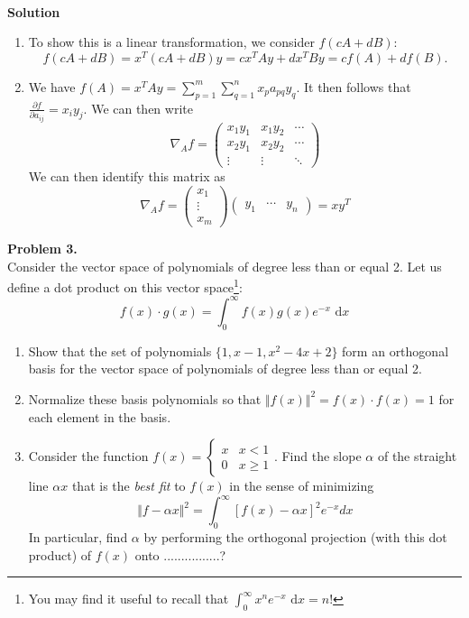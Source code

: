 \documentclass[11pt]{article}
\newcommand{\diff}{\,\mathrm{d}}
\begin{document}
\

\noindent \textbf{Solution}\\
\begin{enumerate}
\item To show this is a linear transformation, we consider $f(cA+dB)$:
$$f(cA+dB) = x^T(cA +dB) y = c x^TAy + dx^TBy = cf(A) + df(B).$$
\item We have $f(A) = x^TAy = \sum_{p = 1}^m\sum_{q = 1}^n x_p a_{pq} y_q$. It then follows that $\frac{\partial f}{\partial a_{ij}} = x_iy_j$. We can then write 
$$
\nabla_A f = \begin{pmatrix} x_1y_1 & x_1y_2 & \cdots \\ x_2y_1 & x_2y_2 & \cdots \\ \vdots & \vdots & \ddots \end{pmatrix}
$$
We can then identify this matrix as 
$$
\nabla_A f = \begin{pmatrix} x_1 \\ \vdots \\ x_m\end{pmatrix} \begin{pmatrix} y_1 & \cdots & y_n \end{pmatrix} = xy^T
$$
\end{enumerate}

\newpage

\noindent \textbf{Problem 3.}\\
Consider the vector space of polynomials of degree less than or equal 2. Let us define a dot product on this vector space\footnote{You may find it useful to recall that $\int_0^{\infty} x^n e^{-x}\,\diff x = n!$}:
$$f(x)\cdot g(x) = \int_0^{\infty} f(x)g(x) e^{-x} \, \diff x$$
\begin{enumerate}
\item Show that the set of polynomials $\{1, x-1,x^2-4x+2 \}$ form an orthogonal basis for the vector space of polynomials of degree less than or equal 2.
\item Normalize these basis polynomials so that $\Vert f(x) \Vert^2 = f(x)\cdot f(x) = 1$ for each element in the basis.
\item Consider the function $f(x) = \begin{cases} x & x < 1 \\ 0 & x \ge 1 \end{cases}$.   Find the slope $\alpha$ of the straight line $\alpha x$ that is the \emph{best fit} to $f(x)$ in the sense of minimizing
$$
\Vert f - \alpha x \Vert^2 = \int_0^\infty \left[ f(x) - \alpha x \right]^2 e^{-x} dx
$$
In particular, find $\alpha$ by performing the orthogonal projection (with this dot product) of $f(x)$ onto ................?
\end{enumerate}
\end{document}
